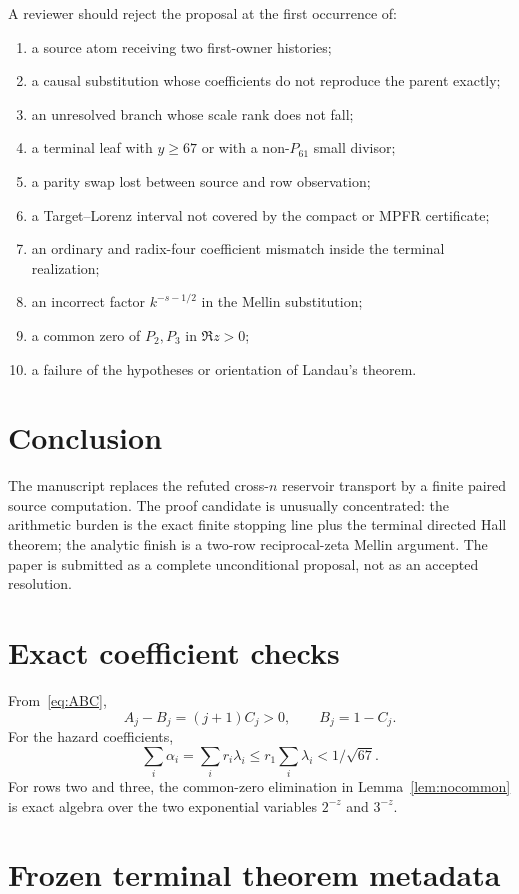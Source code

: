 \documentclass[11pt]{article}
\begin{document}
A reviewer should reject the proposal at the first occurrence of:
\begin{enumerate}
\item a source atom receiving two first-owner histories;
\item a causal substitution whose coefficients do not reproduce the parent exactly;
\item an unresolved branch whose scale rank does not fall;
\item a terminal leaf with $y\ge67$ or with a non-$P_{61}$ small divisor;
\item a parity swap lost between source and row observation;
\item a Target--Lorenz interval not covered by the compact or MPFR certificate;
\item an ordinary and radix-four coefficient mismatch inside the terminal realization;
\item an incorrect factor $k^{-s-1/2}$ in the Mellin substitution;
\item a common zero of $P_2,P_3$ in $\Re z>0$;
\item a failure of the hypotheses or orientation of Landau's theorem.
\end{enumerate}

\section{Conclusion}

The manuscript replaces the refuted cross-$n$ reservoir transport by a finite paired source computation.  The proof candidate is unusually concentrated: the arithmetic burden is the exact finite stopping line plus the terminal directed Hall theorem; the analytic finish is a two-row reciprocal-zeta Mellin argument.  The paper is submitted as a complete unconditional proposal, not as an accepted resolution.

\appendix
\section{Exact coefficient checks}

From~\eqref{eq:ABC},
\[
 A_j-B_j=(j+1)C_j>0,
 \qquad B_j=1-C_j.
\]
For the hazard coefficients,
\[
 \sum_i\alpha_i=\sum_i r_i\lambda_i
 \le r_1\sum_i\lambda_i<1/\sqrt{67}.
\]
For rows two and three, the common-zero elimination in Lemma~\ref{lem:nocommon} is exact algebra over the two exponential variables $2^{-z}$ and $3^{-z}$.

\section{Frozen terminal theorem metadata}
\end{document}
